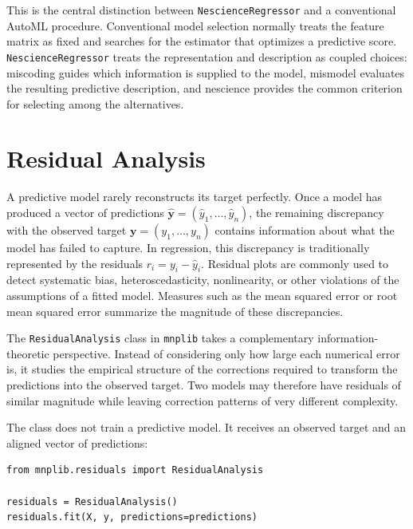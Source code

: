 This is the central distinction between \texttt{NescienceRegressor} and a conventional AutoML procedure. Conventional model selection normally treats the feature matrix as fixed and searches for the estimator that optimizes a predictive score. \texttt{NescienceRegressor} treats the representation and description as coupled choices: miscoding guides which information is supplied to the model, mismodel evaluates the resulting predictive description, and nescience provides the common criterion for selecting among the alternatives.

%
%

\section{Residual Analysis}
\label{sec:machine_learning_residuals}

A predictive model rarely reconstructs its target perfectly. Once a model has produced a vector of predictions $\widehat{\mathbf y} = (\widehat y_1,\ldots,\widehat y_n)$, the remaining discrepancy with the observed target $\mathbf y=(y_1,\ldots,y_n)$ contains information about what the model has failed to capture. In regression, this discrepancy is traditionally represented by the residuals $r_i = y_i-\widehat y_i$. Residual plots are commonly used to detect systematic bias, heteroscedasticity, nonlinearity, or other violations of the assumptions of a fitted model. Measures such as the mean squared error or root mean squared error summarize the magnitude of these discrepancies.

The \texttt{ResidualAnalysis} class in \texttt{mnplib} takes a complementary information-theoretic perspective. Instead of considering only how large each numerical error is, it studies the empirical structure of the corrections required to transform the predictions into the observed target. Two models may therefore have residuals of similar magnitude while leaving correction patterns of very different complexity.

The class does not train a predictive model. It receives an observed target and an aligned vector of predictions:

\begin{sourcecode}
{\scriptsize
\begin{verbatim}
from mnplib.residuals import ResidualAnalysis

residuals = ResidualAnalysis()
residuals.fit(X, y, predictions=predictions)
\end{verbatim}}
\end{sourcecode}


